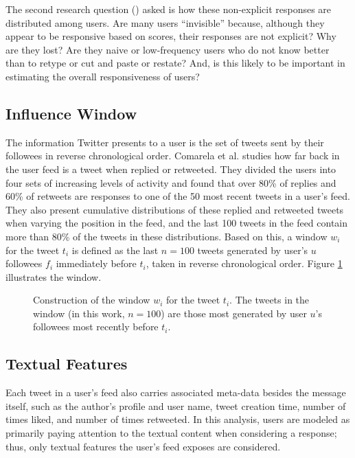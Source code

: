 The second research question (\ResearchQuestion\label{rq:usersDistribution}) asked is how these non-explicit responses are distributed among users.  Are many users ``invisible'' because, although they appear to be responsive based on scores, their responses are not explicit?  Why are they lost?  Are they naive or low-frequency users who do not know better than to retype or cut and paste or restate? And, is this likely to be important in estimating the overall responsiveness of users?

\subsection{Influence Window}

The information Twitter presents to a user is the set of tweets sent by their followees in reverse chronological order. Comarela et al. \cite{Comarela2012} studies how far back in the user feed is a tweet when replied or retweeted. They divided the users into four sets of increasing levels of activity and found that over 80\% of replies and 60\% of retweets are responses to one of the 50 most recent tweets in a user's feed. They also present cumulative distributions of these replied and retweeted tweets when varying the position in the feed, and the last 100 tweets in the feed contain more than 80\% of the tweets in these distributions.  
Based on this, a window $w_i$ for the tweet $t_i$ is defined as the last $n=100$ tweets generated by user's $u$ followees $f_i$ immediately before $t_i$, taken in reverse chronological order.
Figure \ref{fig:fig_window_explanation} illustrates the window. 

\begin{figure}[!htbp]
\centering
\fontsize{9pt}{10pt}\selectfont

\caption{Construction of the window $w_i$ for the tweet $t_i$. The tweets in the window (in this work, $n=100$) are those most generated by user $u$'s followees most recently before $t_i$.} \label{fig:fig_window_explanation}
\end{figure}

\subsection{Textual Features}

Each tweet in a user's feed also carries associated meta-data besides the message itself, such as the author's profile and user name, tweet creation time, number of times liked, and number of times retweeted. In this analysis, users are modeled as primarily paying attention to the textual content when considering a response; thus, only textual features the user's feed exposes are considered.  

